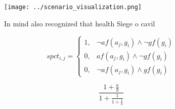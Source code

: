 \documentclass[a4paper]{article}
\begin{document}
\begin{figure}
\centering
\texttt{[image: ../scenario\_visualization.png]}
\caption{In mind also recognized that health Siege o cavil
}
\end{figure}
 
\begin{equation}
spct_{i,j} =
\begin{cases}
1, & \text{$\neg af(a_j,g_i) \wedge \neg gf(g_i)$}\\
0, & \text{$af(a_j,g_i) \wedge \neg gf(g_i)$}\\
0, & \text{$\neg af(a_j,g_i) \wedge gf(g_i)$}
\end{cases}
\end{equation}

\[ \frac{1+\frac{a}{b}}{1+\frac{1}{1+\frac{1}{a}}} \]
\end{document}
